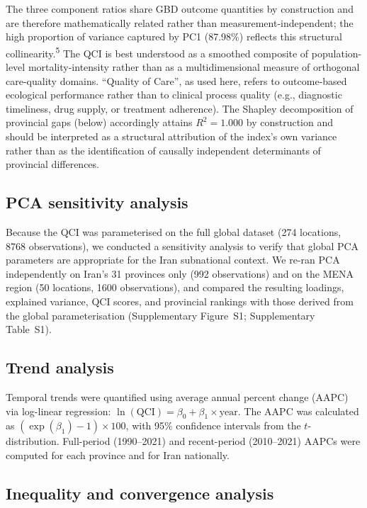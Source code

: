 \documentclass[12pt]{article}
\begin{document}
The three component ratios share GBD outcome quantities by construction and are therefore mathematically related rather than measurement-independent; the high proportion of variance captured by PC1 (87.98\%) reflects this structural collinearity.\textsuperscript{5} The QCI is best understood as a smoothed composite of population-level mortality-intensity rather than as a multidimensional measure of orthogonal care-quality domains. ``Quality of Care'', as used here, refers to outcome-based ecological performance rather than to clinical process quality (e.g., diagnostic timeliness, drug supply, or treatment adherence). The Shapley decomposition of provincial gaps (below) accordingly attains $R^2 = 1.000$ by construction and should be interpreted as a structural attribution of the index's own variance rather than as the identification of causally independent determinants of provincial differences.

\subsection{PCA sensitivity analysis}

Because the QCI was parameterised on the full global dataset (274 locations, 8768 observations), we conducted a sensitivity analysis to verify that global PCA parameters are appropriate for the Iran subnational context. We re-ran PCA independently on Iran's 31 provinces only (992 observations) and on the MENA region (50 locations, 1600 observations), and compared the resulting loadings, explained variance, QCI scores, and provincial rankings with those derived from the global parameterisation (Supplementary Figure~S1; Supplementary Table~S1).

\subsection{Trend analysis}

Temporal trends were quantified using average annual percent change (AAPC) via log-linear regression: $\ln(\text{QCI}) = \beta_0 + \beta_1 \times \text{year}$. The AAPC was calculated as $(\exp(\beta_1) - 1) \times 100$, with 95\% confidence intervals from the $t$-distribution. Full-period (1990--2021) and recent-period (2010--2021) AAPCs were computed for each province and for Iran nationally.

\subsection{Inequality and convergence analysis}
\end{document}
